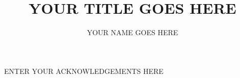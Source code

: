 \documentclass[12pt,PhD]{thesiscls}%
\begin{document}

\title{YOUR TITLE GOES HERE}
\author{YOUR NAME GOES HERE}

\setlength{\footskip}{2cm}

\let\cleardoublepage\clearpage


\beforeabstract
{}

\afterabstract
{}

ENTER YOUR ACKNOWLEDGEMENTS HERE

\afterpreface





\pagestyle{fancy}
\lhead{} %
\lfoot{}
\cfoot{\thepage}
\rfoot{}
%
%
%
\end{document}

